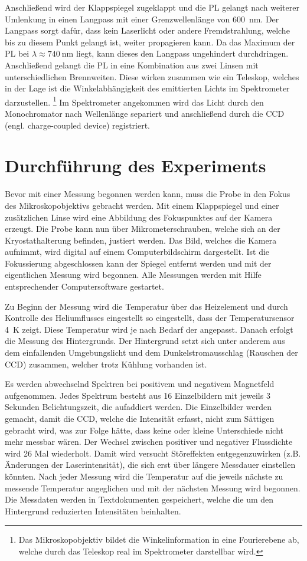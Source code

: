Anschließend wird der Klappspiegel zugeklappt und die PL gelangt nach weiterer Umlenkung in einen 
Langpass mit einer Grenzwellenlänge von \SI{600}{\nano\meter}. 
Der Langpass sorgt dafür, dass kein Laserlicht oder andere Fremdstrahlung,
welche bis zu diesem Punkt gelangt ist, weiter propagieren kann. 
Da das Maximum der PL bei $\lambda \approx \SI{740}{\nano\meter}$ liegt, 
kann dieses den Langpass ungehindert durchdringen.
Anschließend gelangt die PL in eine Kombination aus zwei Linsen mit unterschiedlichen Brennweiten.
Diese wirken zusammen wie ein Teleskop, welches in der Lage ist die Winkelabhängigkeit des emittierten Lichts 
im Spektrometer darzustellen.
\footnote{Das Mikroskopobjektiv bildet die Winkelinformation in eine Fourierebene ab,
welche durch das Teleskop real im Spektrometer darstellbar wird.} 
Im Spektrometer angekommen wird das Licht durch den Monochromator nach Wellenlänge separiert und 
anschließend durch die CCD (engl. charge-coupled device) registriert.

\section{Durchführung des Experiments}
Bevor mit einer Messung begonnen werden kann, muss die Probe in den Fokus des Mikroskopobjektivs 
gebracht werden. 
Mit einem Klappspiegel und einer zusätzlichen Linse wird eine Abbildung des 
Fokuspunktes auf der Kamera erzeugt. 
Die Probe kann nun über Mikrometerschrauben, welche sich an der 
Kryostathalterung befinden, justiert werden.
Das Bild, welches die Kamera aufnimmt, wird digital auf einem Computerbildschirm dargestellt. 
Ist die Fokussierung abgeschlossen kann der Spiegel entfernt werden und mit der eigentlichen Messung 
wird begonnen.
Alle Messungen werden mit Hilfe entsprechender Computersoftware gestartet.

Zu Beginn der Messung wird die Temperatur 
über das Heizelement und durch 
Kontrolle des Heliumflusses eingestellt so eingestellt, dass der Temperatursensor \SI{4}{\kelvin} zeigt. 
Diese Temperatur wird je nach Bedarf der angepasst.
Danach erfolgt die Messung des Hintergrunds.
Der Hintergrund setzt sich unter anderem aus dem einfallenden Umgebungslicht und 
dem Dunkelstromausschlag (Rauschen der CCD) zusammen, welcher trotz Kühlung vorhanden ist.
 
Es werden abwechselnd Spektren bei positivem und negativem Magnetfeld aufgenommen. 
Jedes Spektrum besteht aus 16 Einzelbildern mit jeweils 3 Sekunden Belichtungszeit, die aufaddiert werden.
Die Einzelbilder werden gemacht, damit die CCD, welche die Intensität erfasst, nicht zum Sättigen 
gebracht wird, was zur Folge hätte, dass keine oder kleine Unterschiede nicht mehr messbar wären.
Der Wechsel zwischen positiver und negativer Flussdichte wird 26 Mal wiederholt. Damit 
wird versucht Störeffekten entgegenzuwirken (z.B. Änderungen der Laserintensität), die sich erst über 
längere Messdauer einstellen könnten.
Nach jeder Messung wird die Temperatur auf die jeweils nächste zu messende Temperatur angeglichen
und mit der nächsten Messung wird begonnen.
Die Messdaten werden in Textdokumenten gespeichert, welche die um den Hintergrund 
reduzierten Intensitäten beinhalten.

